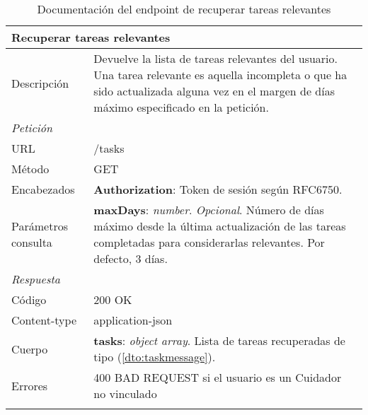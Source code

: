 \begin{table}[H]
\begin{longtable}{|p{} p{}|}
    \hline
    \multicolumn{2}{|l|}{\textbf{Recuperar tareas relevantes}} \\ \hline 
    Descripción         & Devuelve la lista de tareas relevantes del usuario. Una tarea relevante es aquella incompleta o que ha sido actualizada alguna vez en el margen de días máximo especificado en la petición. \\ \hline \hline
    \multicolumn{2}{|l|}{\emph{Petición}}  \\ \hline 
    URL      & /tasks \\ \hline
    Método   & GET                  \\ \hline
    Encabezados  & 
    \textbf{Authorization}: Token de sesión según RFC6750. \\ \hline
    Parámetros consulta  & 
    \textbf{maxDays}: \emph{number}. \emph{Opcional}. Número de días máximo desde la última actualización de las tareas completadas para considerarlas relevantes. Por defecto, 3 días. \\ \hline \hline
    \multicolumn{2}{|l|}{\emph{Respuesta}} \\ \hline 
    Código          & 200 OK          \\ \hline
    Content-type    & application-json  \\ \hline
    Cuerpo  & 
    \textbf{tasks}: \emph{object array}. Lista de tareas recuperadas de tipo \nameref{dto:taskmessage} (\ref{dto:taskmessage}). \\ \hline \hline
    Errores & 400 BAD REQUEST si el usuario es un Cuidador no vinculado
    \\ \hline
    \caption{Documentación del endpoint de recuperar tareas relevantes}
    \label{api:recuperar_tarea}
\end{longtable}
\end{table}

